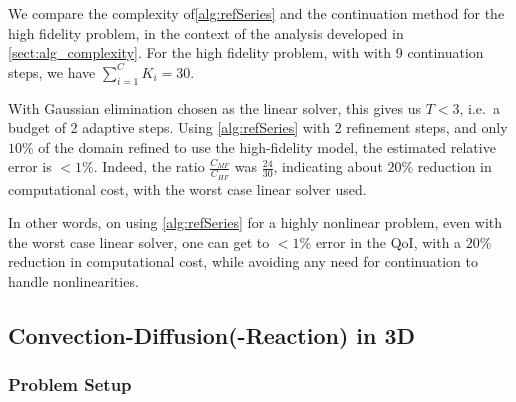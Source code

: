 {We compare the complexity of\cref{alg:refSeries} and the continuation method for the high fidelity problem, in the context of the analysis developed in \cref{sect:alg_complexity}. For the high fidelity problem, with  with 9 continuation steps, we have $\sum\limits_{i=1}^{C} K_i=30$. 
 
With Gaussian elimination chosen as the linear solver, this gives us $T < 3$, i.e.\ a budget of 2 adaptive steps. Using \cref{alg:refSeries} with 2 refinement steps, and only $10\%$ of the domain refined to use the high-fidelity model, the estimated relative error is $<1\%$. Indeed, the ratio $\frac{C_{MF}}{C_{HF}}$ was $\frac{24}{30}$, indicating about $20\%$ reduction in computational cost, with the worst case linear solver used. 

In other words, on using \cref{alg:refSeries} for a highly nonlinear problem, even with the worst case linear solver, one can get to $<1\%$ error in the QoI, with a $20\%$ reduction in computational cost, while avoiding any need for continuation to handle nonlinearities. }

%
%
%
%
%
%
%
%

\subsection{Convection-Diffusion(-Reaction) in 3D} \label{sec:cdvcdr3D}


\subsubsection{Problem Setup} \label{sec:setup3D}

